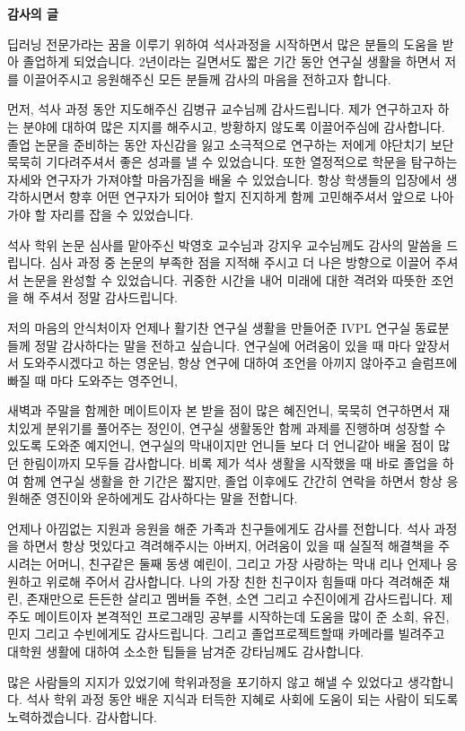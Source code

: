 \newpage
\pagestyle{empty} \begin{center} {\huge \textbf{감사의 글}}
\end{center}
\thispagestyle{empty}
\vspace{1cm} %

딥러닝 전문가라는 꿈을 이루기 위하여 석사과정을 시작하면서 많은 분들의 도움을 받아 졸업하게 되었습니다. 2년이라는 길면서도 짧은 기간 동안 연구실 생활을 하면서 저를 이끌어주시고 응원해주신 모든 분들께 감사의 마음을 전하고자 합니다.

먼저, 석사 과정 동안 지도해주신 김병규 교수님께 감사드립니다. 제가 연구하고자 하는 분야에 대하여 많은 지지를 해주시고, 방황하지 않도록 이끌어주심에 감사합니다. 졸업 논문을 준비하는 동안 자신감을 잃고 소극적으로 연구하는 저에게 야단치기 보단 묵묵히 기다려주셔서 좋은 성과를 낼 수 있었습니다. 또한 열정적으로 학문을 탐구하는 자세와 연구자가 가져야할 마음가짐을 배울 수 있었습니다. 항상 학생들의 입장에서 생각하시면서 향후 어떤 연구자가 되어야 할지 진지하게 함께 고민해주셔서 앞으로 나아가야 할 자리를 잡을 수 있었습니다.

석사 학위 논문 심사를 맡아주신 박영호 교수님과 강지우 교수님께도 감사의 말씀을 드립니다. 심사 과정 중 논문의 부족한 점을 지적해 주시고 더 나은 방향으로 이끌어 주셔서 논문을 완성할 수 있었습니다. 귀중한 시간을 내어 미래에 대한 격려와 따뜻한 조언을 해 주셔서 정말 감사드립니다.



저의 마음의 안식처이자 언제나 활기찬 연구실 생활을 만들어준 IVPL 연구실 동료분들께 정말 감사하다는 말을 전하고 싶습니다. 연구실에 어려움이 있을 때 마다 앞장서서 도와주시겠다고 하는 영운님, 항상 연구에 대하여 조언을 아끼지 않아주고 슬럼프에 빠질 때 마다 도와주는 영주언니, 

\newpage
\thispagestyle{empty}
 새벽과 주말을 함께한 메이트이자 본 받을 점이 많은 혜진언니, 묵묵히 연구하면서 재치있게 분위기를 풀어주는 정인이, 연구실 생활동안 함께 과제를 진행하며 성장할 수 있도록 도와준 예지언니, 연구실의 막내이지만 언니들 보다 더 언니같아 배울 점이 많던 한림이까지 모두들 감사합니다. 비록 제가 석사 생활을 시작했을 때 바로 졸업을 하여 함께 연구실 생활을 한 기간은 짧지만, 졸업 이후에도 간간히 연락을 하면서 항상 응원해준 영진이와 운하에게도 감사하다는 말을 전합니다. 

언제나 아낌없는 지원과 응원을 해준 가족과 친구들에게도 감사를 전합니다. 석사 과정을 하면서 항상 멋있다고 격려해주시는 아버지, 어려움이 있을 때 실질적 해결책을 주시려는 어머니, 친구같은 둘째 동생 예린이, 그리고 가장 사랑하는 막내 리나 언제나 응원하고 위로해 주어서 감사합니다. 나의 가장 친한 친구이자 힘들때 마다 격려해준 채린, 존재만으로 든든한 살리고 멤버들 주현, 소연 그리고 수진이에게 감사드립니다. 제주도 메이트이자 본격적인 프로그래밍 공부를 시작하는데 도움을 많이 준 소희, 유진, 민지 그리고 수빈에게도 감사드립니다. 그리고 졸업프로젝트할때 카메라를 빌려주고 대학원 생활에 대하여 소소한 팁들을 남겨준 강타님께도 감사합니다.

많은 사람들의 지지가 있었기에 학위과정을 포기하지 않고 해낼 수 있었다고 생각합니다. 석사 학위 과정 동안 배운 지식과 터득한 지혜로 사회에 도움이 되는 사람이 되도록 노력하겠습니다. 감사합니다.